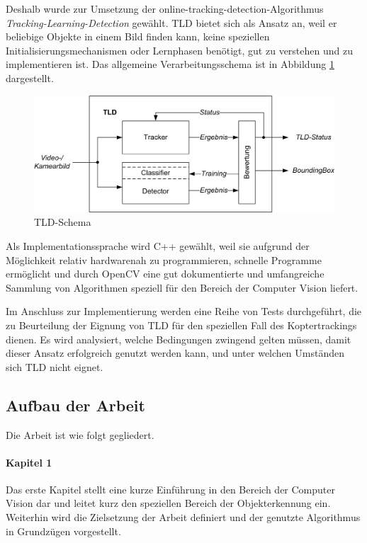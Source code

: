Deshalb wurde zur Umsetzung der online-tracking-detection-Algorithmus \textit{Tracking-Learning-Detection} \cite{TLD} gewählt. TLD bietet sich als Ansatz an, weil er beliebige Objekte in einem Bild finden kann, keine speziellen Initialisierungsmechanismen oder Lernphasen benötigt, gut zu verstehen und zu implementieren ist. Das allgemeine Verarbeitungsschema ist in Abbildung \ref{TLD-Schema} dargestellt.

\begin{figure}
\centering{}\includegraphics[scale=0.75]{../pictures/TLD-Framework.jpg}\caption{TLD-Schema}
\label{TLD-Schema}
\end{figure}

Als Implementationssprache wird C++ gewählt, weil sie aufgrund der Möglichkeit relativ hardwarenah zu programmieren, schnelle Programme ermöglicht und durch OpenCV \cite{OCV} eine gut dokumentierte und umfangreiche Sammlung von Algorithmen speziell für den Bereich der Computer Vision liefert.

Im Anschluss zur Implementierung werden eine Reihe von Tests durchgeführt, die zu Beurteilung der Eignung von TLD für den speziellen Fall des Koptertrackings dienen. Es wird analysiert, welche Bedingungen zwingend gelten müssen, damit dieser Ansatz erfolgreich genutzt werden kann, und unter welchen Umständen sich TLD nicht eignet.


\subsection{Aufbau der Arbeit}
Die Arbeit ist wie folgt gegliedert.

\paragraph{Kapitel 1}
Das erste Kapitel stellt eine kurze Einführung in den Bereich der Computer Vision dar und leitet kurz den speziellen Bereich der Objekterkennung ein. Weiterhin wird die Zielsetzung der Arbeit definiert und der genutzte Algorithmus in Grundzügen vorgestellt.

